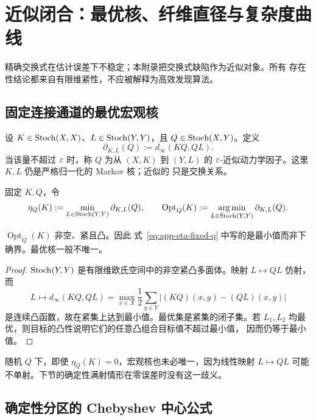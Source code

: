 \section{近似闭合：最优核、纤维直径与复杂度曲线}
\label{app:approximate-theory}

精确交换式在估计误差下不稳定；本附录把交换式缺陷作为近似对象。所有
存在性结论都来自有限维紧性，不应被解释为高效发现算法。

\subsection{固定连接通道的最优宏观核}

设 $K\in\operatorname{Stoch}(X,X)$、$L\in\operatorname{Stoch}(Y,Y)$，且
$Q\in\operatorname{Stoch}(X,Y)$。定义
\begin{equation}
  \partial_{K,L}(Q):=d_\infty(KQ,QL).
  \label{eq:app-factor-defect}
\end{equation}
当该量不超过 $\varepsilon$ 时，称 $Q$ 为从 $(X,K)$ 到 $(Y,L)$ 的
$\varepsilon$-近似动力学因子。这里 $K,L$ 仍是严格归一化的 Markov 核；近似的
只是交换关系。

固定 $K,Q$，令
\begin{equation}
  \eta_Q(K)
  :=\min_{L\in\operatorname{Stoch}(Y,Y)}\partial_{K,L}(Q),
  \qquad
  \operatorname{Opt}_Q(K)
  :=\operatorname*{arg\,min}_{L\in\operatorname{Stoch}(Y,Y)}\partial_{K,L}(Q).
  \label{eq:app-eta-fixed-q}
\end{equation}

\begin{theorem}[有限空间上的最优核达到]
\label{thm:app-optimal-kernel}
$\operatorname{Opt}_Q(K)$ 非空、紧且凸。因此
式~\eqref{eq:app-eta-fixed-q} 中写的是最小值而非下确界。最优核一般不唯一。
\end{theorem}

\begin{proof}
$\operatorname{Stoch}(Y,Y)$ 是有限维欧氏空间中的非空紧凸多面体。映射
$L\mapsto QL$ 仿射，而
\[
 L\longmapsto d_\infty(KQ,QL)
 =\max_{x\in X}\frac12\sum_{y\in Y}
   |(KQ)(x,y)-(QL)(x,y)|
\]
是连续凸函数，故在紧集上达到最小值。最优集是紧集的闭子集。若
$L_1,L_2$ 均最优，则目标的凸性说明它们的任意凸组合目标值不超过最小值，
因而仍等于最小值。
\end{proof}

随机 $Q$ 下，即使 $\eta_Q(K)=0$，宏观核也未必唯一，因为线性映射
$L\mapsto QL$ 可能不单射。下节的确定性满射情形在零误差时没有这一歧义。

\subsection{确定性分区的 Chebyshev 中心公式}

